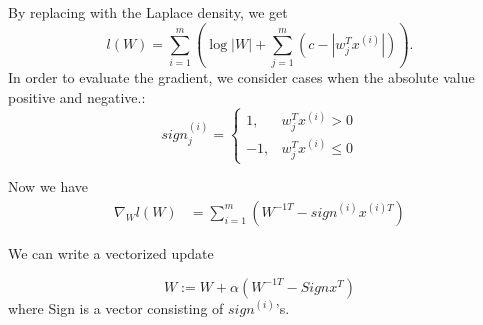 \begin{answer}
   By replacing with the Laplace density, we get
$$
l(W) = \sum_{i=1}^m(\log |W| + \sum_{j=1}^m(c - |w^T_jx^{(i)}|)).
$$
In order to evaluate the gradient, we consider cases when the absolute value positive and negative.:
$$
sign^{(i)}_j = \begin{cases}
1, &w_j^Tx^{(i)} >0\\
-1, &w^T_jx^{(i)}\le 0
\end{cases}
$$

Now we have
$$
\begin{aligned}
\nabla_Wl(W) &= \sum_{i=1}^m (W^{-1T} -  sign^{(i)}x^{(i)T})
\end{aligned}
$$

We can write a vectorized update

$$
W:= W + \alpha(W^{-1T}  - Sign x^T)
$$
where Sign is a vector consisting of $sign^{(i)}$'s.
\end{answer}

